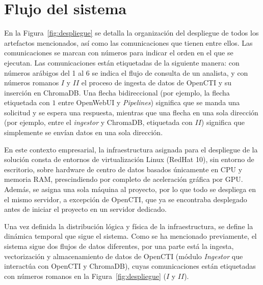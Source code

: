\documentclass[12pt]{report}
\newcommand{\pipelines}{\textit{Pipelines}}
\begin{document}
\section{Flujo del sistema}
   En la Figura~\ref{fig:despliegue} se detalla la organización del despliegue de todos los artefactos mencionados, así como las comunicaciones que tienen entre ellos. Las comunicaciones se marcan con números para indicar el orden en el que se ejecutan. Las comunicaciones están etiquetadas de la siguiente manera: con números arábigos del 1 al 6 se indica el flujo de consulta de un analista, y con números romanos $I$ y $II$ el proceso de ingesta de datos de OpenCTI y su inserción en ChromaDB. Una flecha bidireccional (por ejemplo, la flecha etiquetada con $1$ entre OpenWebUI y \pipelines) significa que se manda una solicitud y se espera una respuesta, mientras que una flecha en una sola dirección (por ejemplo, entre el \textit{ingestor} y ChromaDB, etiquetada con $II$) significa que simplemente se envían datos en una sola dirección.
   
   En este contexto empresarial, la infraestructura asignada para el despliegue de la solución consta de entornos de virtualización Linux (RedHat 10), sin entorno de escritorio, sobre hardware de centro de datos basados únicamente en CPU y memoria RAM, prescindiendo por completo de aceleración gráfica por GPU. Además, se asigna una sola máquina al proyecto, por lo que todo se despliega en el mismo servidor, a excepción de OpenCTI, que ya se encontraba desplegado antes de iniciar el proyecto en un servidor dedicado.
   
    Una vez definida la distribución lógica y física de la infraestructura, se define la dinámica temporal que sigue el sistema. Como se ha mencionado previamente, el sistema sigue dos flujos de datos diferentes, por una parte está la ingesta, vectorización y almacenamiento de datos de OpenCTI (módulo \textit{Ingestor} que interactúa con OpenCTI y ChromaDB), cuyas comunicaciones están etiquetadas con números romanos en la Figura~\ref{fig:despliegue} ($I$ y $II$).
    
\end{document}

